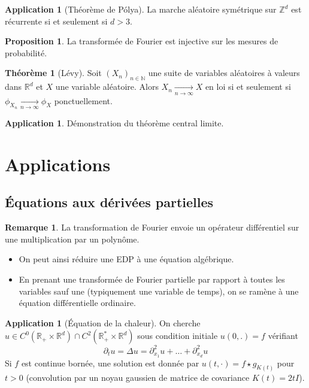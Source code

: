 \documentclass[11pt,a4paper,twocolumn]{article}
\theoremstyle{definition}
\newtheorem{proposition}[equation]{Proposition}
\newtheorem{theorem}[equation]{Théorème}
\newtheorem{application}[equation]{Application}
\newtheorem{remark}[equation]{Remarque}
\newcounter{n}
\def\Z{\mathbb{Z}}
\def\N{\mathbb{N}}
\def\R{\mathbb{R}}
\begin{document}
\begin{application}[Théorème de Pólya]
  La marche aléatoire symétrique sur $\Z^d$ est récurrente si et seulement si $d
  > 3$.
\end{application}

\begin{proposition}
  La transformée de Fourier est injective sur les mesures de probabilité.
\end{proposition}

\begin{theorem}[Lévy]
  Soit $(X_n)_{n \in \N}$ une suite de variables aléatoires à valeurs dans
  $\R^d$ et $X$ une variable aléatoire. Alors $X_n \underset{n \to
    \infty}{\longrightarrow} X$ en loi si et seulement si $\phi_{X_n}
  \underset{n \to \infty}{\longrightarrow} \phi_X$ ponctuellement.
\end{theorem}

\begin{application}
  Démonstration du théorème central limite.
\end{application}

\section{Applications}

\subsection{Équations aux dérivées partielles}

\begin{remark}
  La transformation de Fourier envoie un opérateur différentiel sur une
  multiplication par un polynôme.
  \begin{itemize}
  \item On peut ainsi réduire une EDP à une équation algébrique.
  \item En prenant une transformée de Fourier partielle par rapport à toutes les
    variables sauf une (typiquement une variable de temps), on se ramène à une
    équation différentielle ordinaire.
  \end{itemize}
\end{remark}

\begin{application}[Équation de la chaleur]
  On cherche $u \in C^0(\R_+ \times \R^d) \cap C^2(\R_+^* \times \R^d)$
  sous condition initiale $u(0, .) = f$ vérifiant
  \[ \partial_t u = \Delta u = \partial^2_{x_1} u + \ldots + \partial^2_{x_d} u \]
  Si $f$ est continue bornée, une solution est donnée par $u(t, \cdot) = f \star
  g_{K(t)}$ pour $t > 0$ (convolution par un noyau gaussien de matrice de
  covariance $K(t) = 2tI$).
\end{application}
\end{document}
